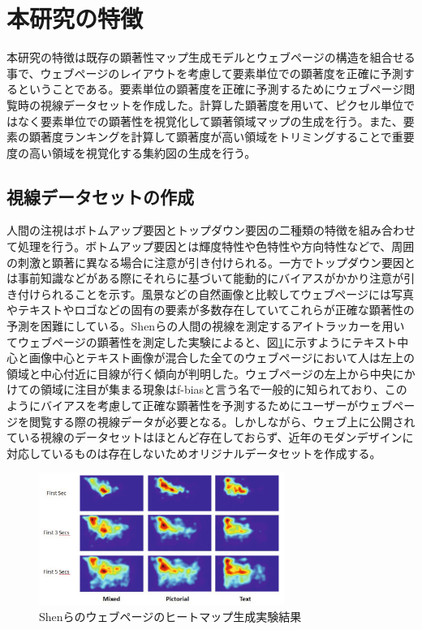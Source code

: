\newpage
\renewcommand{\baselinestretch}{1.5}
\section{本研究の特徴}
\renewcommand{\baselinestretch}{1}
\par 本研究の特徴は既存の顕著性マップ生成モデルとウェブページの構造を組合せる事で、ウェブページのレイアウトを考慮して要素単位での顕著度を正確に予測するということである。要素単位の顕著度を正確に予測するためにウェブページ閲覧時の視線データセットを作成した。計算した顕著度を用いて、ピクセル単位ではなく要素単位での顕著性を視覚化して顕著領域マップの生成を行う。また、要素の顕著度ランキングを計算して顕著度が高い領域をトリミングすることで重要度の高い領域を視覚化する集約図の生成を行う。

\subsection{視線データセットの作成}
\par 人間の注視はボトムアップ要因とトップダウン要因の二種類の特徴を組み合わせて処理を行う。ボトムアップ要因とは輝度特性や色特性や方向特性などで、周囲の刺激と顕著に異なる場合に注意が引き付けられる。一方でトップダウン要因とは事前知識などがある際にそれらに基づいて能動的にバイアスがかかり注意が引き付けられることを示す。風景などの自然画像と比較してウェブページには写真やテキストやロゴなどの固有の要素が多数存在していてこれらが正確な顕著性の予測を困難にしている。Shenら\cite{shen2014webpage}の人間の視線を測定するアイトラッカーを用いてウェブページの顕著性を測定した実験によると、図\ref{fig_shen-experience}に示すようにテキスト中心と画像中心とテキスト画像が混合した全てのウェブページにおいて人は左上の領域と中心付近に目線が行く傾向が判明した。ウェブページの左上から中央にかけての領域に注目が集まる現象はf-biasと言う名で一般的に知られており、このようにバイアスを考慮して正確な顕著性を予測するためにユーザーがウェブページを閲覧する際の視線データが必要となる。しかしながら、ウェブ上に公開されている視線のデータセットはほとんど存在しておらず、近年のモダンデザインに対応しているものは存在しないためオリジナルデータセットを作成する。

\begin{figure}[H]
  \centering
  \includegraphics[width=8cm]{figures/shen-bias.png}
  \caption{Shenらのウェブページのヒートマップ生成実験結果\cite{shen2014webpage}}
  \label{fig_shen-experience}
\end{figure}

